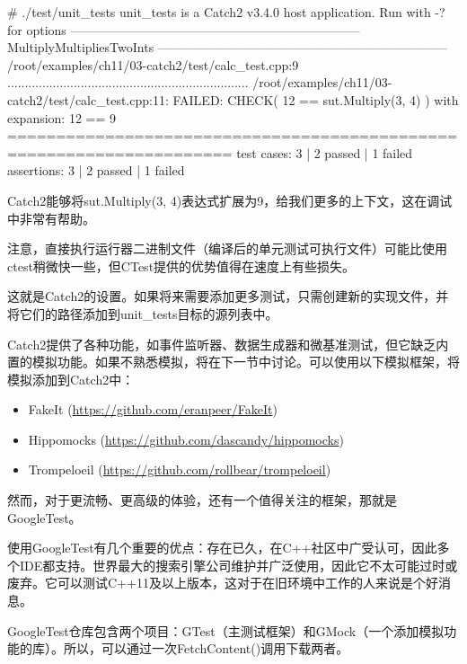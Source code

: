 \begin{shell}
# ./test/unit_tests
unit_tests is a Catch2 v3.4.0 host application.
Run with -? for options
---------------------------------------------------------------------
MultiplyMultipliesTwoInts
---------------------------------------------------------------------
/root/examples/ch11/03-catch2/test/calc_test.cpp:9
.....................................................................
/root/examples/ch11/03-catch2/test/calc_test.cpp:11: FAILED:
  CHECK( 12 == sut.Multiply(3, 4) )
with expansion:
  12 == 9
=====================================================================
test cases: 3 | 2 passed | 1 failed
assertions: 3 | 2 passed | 1 failed
\end{shell}

Catch2能够将sut.Multiply(3, 4)表达式扩展为9，给我们更多的上下文，这在调试中非常有帮助。

注意，直接执行运行器二进制文件（编译后的单元测试可执行文件）可能比使用ctest稍微快一些，但CTest提供的优势值得在速度上有些损失。

这就是Catch2的设置。如果将来需要添加更多测试，只需创建新的实现文件，并将它们的路径添加到unit\_tests目标的源列表中。

Catch2提供了各种功能，如事件监听器、数据生成器和微基准测试，但它缺乏内置的模拟功能。如果不熟悉模拟，将在下一节中讨论。可以使用以下模拟框架，将模拟添加到Catch2中：

\begin{itemize}
\item
FakeIt (\url{https://github.com/eranpeer/FakeIt})

\item
Hippomocks (\url{https://github.com/dascandy/hippomocks})

\item
Trompeloeil (\url{https://github.com/rollbear/trompeloeil})
\end{itemize}

然而，对于更流畅、更高级的体验，还有一个值得关注的框架，那就是GoogleTest。


使用GoogleTest有几个重要的优点：存在已久，在C++社区中广受认可，因此多个IDE都支持。世界最大的搜索引擎公司维护并广泛使用，因此它不太可能过时或废弃。它可以测试C++11及以上版本，这对于在旧环境中工作的人来说是个好消息。

GoogleTest仓库包含两个项目：GTest（主测试框架）和GMock（一个添加模拟功能的库）。所以，可以通过一次FetchContent()调用下载两者。

